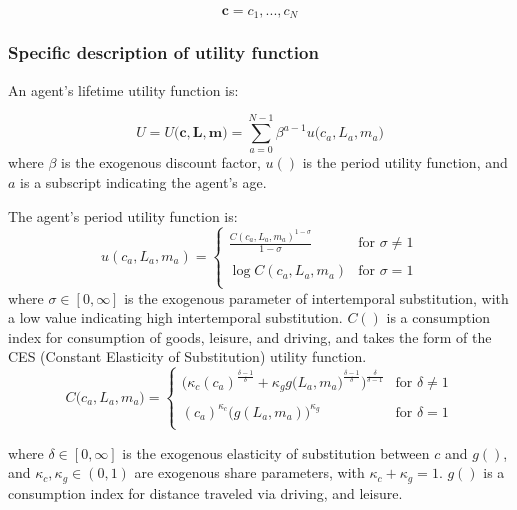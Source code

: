 \documentclass[letter, 12pt, epsf,leqno]{article}
\begin{document}
\begin{equation}\boldsymbol{c} = c_1, ..., c_N\end{equation}

\subsubsection{Specific description of utility function}
An agent's lifetime utility function is:

\begin{equation}
U = U\Big(\boldsymbol{c}, \boldsymbol{L}, \boldsymbol{m}\Big) =\sum_{a=0}^{{N-1}} \beta^{a-1} u\Big(c_{a}, L_{a}, m_{a}\Big)\label{eq:U}
\end{equation}
where $\beta$ is the exogenous discount factor, $u()$ is the period utility function, and $a$ is a subscript indicating the agent's age.  

The agent's period utility function is:
\begin{equation}
u(c_{a}, L_{a}, m_{a})=
   \begin{cases} 
      \frac{C(c_{a}, L_{a}, m_{a})^{1-\sigma}}{1-\sigma} & \text{for } \sigma \ne 1 \\
      \\
     \log{C(c_{a}, L_{a}, m_{a})} & \text{for }\sigma = 1\\ 
   \end{cases}
\end{equation}
where $\sigma \in [0, \infty]$ is the exogenous parameter of intertemporal substitution, with a low value indicating high intertemporal substitution.
$C()$ is a consumption index for consumption of goods, leisure, and driving, and takes the form of the CES (Constant Elasticity of Substitution) utility function.
\begin{equation}
C\Big(c_{a}, L_{a}, m_{a}\Big)=
   \begin{cases} 
       \Bigg(\kappa_c (c_{a})^\frac{\delta-1}{\delta} + \kappa_g g\Big(L_{a}, m_{a}\Big)^\frac{\delta-1}{\delta} \Bigg)^\frac{\delta}{\delta-1}& \text{for } \delta \ne 1 \\
      \\
     (c_{a})^{\kappa_c}\Big(g(L_{a}, m_{a})\Big)^{\kappa_g} & \text{for } \delta = 1\\ 
   \end{cases}
\label{eq:C}
\end{equation}

where $\delta \in [0, \infty]$ is the exogenous elasticity of substitution between $c$ and $g()$, and $\kappa_c, \kappa_g  \in (0, 1)$ are exogenous share parameters, with  $\kappa_c +\kappa_g = 1$.  $g()$ is a consumption index for distance traveled via driving, and leisure. 
\end{document}
